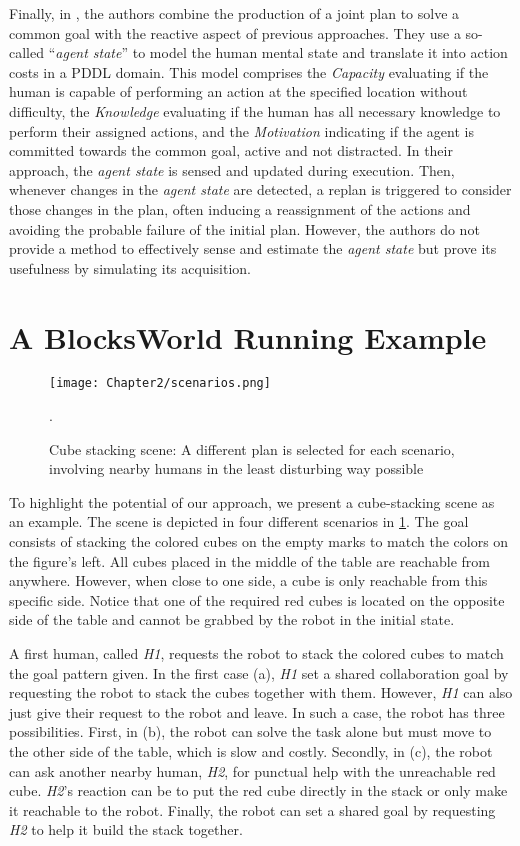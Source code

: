 Finally, in \cite{izquierdo_badiola_improved_2022}, the authors combine the production of a joint plan to solve a common goal with the reactive aspect of previous approaches. 
They use a so-called ``\textit{agent state}'' to model the human mental state and translate it into action costs in a PDDL domain. This model comprises the \textit{Capacity} evaluating if the human is capable of performing an action at the specified location without difficulty, the \textit{Knowledge} evaluating if the human has all necessary knowledge to perform their assigned actions, and the \textit{Motivation} indicating if the agent is committed towards the common goal, active and not distracted. 
In their approach, the \textit{agent state} is sensed and updated during execution. Then, whenever changes in the \textit{agent state} are detected, a replan is triggered to consider those changes in the plan, often inducing a reassignment of the actions and avoiding the probable failure of the initial plan. However, the authors do not provide a method to effectively sense and estimate the \textit{agent state} but prove its usefulness by simulating its acquisition.


\section{A BlocksWorld Running Example}

\begin{figure}[h]
    \centering
    \texttt{[image: Chapter2/scenarios.png]}
    \caption{Cube stacking scene: A different plan is selected for each scenario, involving nearby humans in the least disturbing way possible}.
    \label{fig:scenarios}
\end{figure}

To highlight the potential of our approach, we present a cube-stacking scene as an example. The scene is depicted in four different scenarios in \ref{fig:scenarios}. The goal consists of stacking the colored cubes on the empty marks to match the colors on the figure's left. All cubes placed in the middle of the table are reachable from anywhere. However, when close to one side, a cube is only reachable from this specific side. Notice that one of the required red cubes is located on the opposite side of the table and cannot be grabbed by the robot in the initial state.

A first human, called \textit{H1}, requests the robot to stack the colored cubes to match the goal pattern given. In the first case (a), \textit{H1} set a shared collaboration goal by requesting the robot to stack the cubes together with them. However, \textit{H1} can also just give their request to the robot and leave. In such a case, the robot has three possibilities. First, in (b), the robot can solve the task alone but must move to the other side of the table, which is slow and costly. Secondly, in (c), the robot can ask another nearby human, \textit{H2}, for punctual help with the unreachable red cube. \textit{H2}'s reaction can be to put the red cube directly in the stack or only make it reachable to the robot. Finally, the robot can set a shared goal by requesting \textit{H2} to help it build the stack together. 

